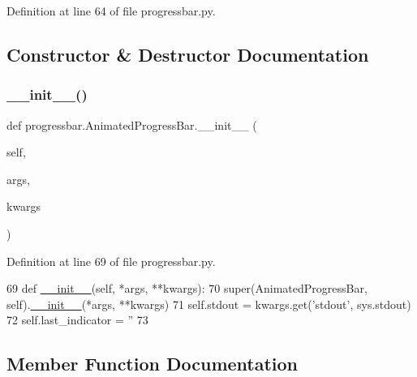 Definition at line 64 of file progressbar.\+py.



\subsection{Constructor \& Destructor Documentation}
\mbox{\label{classprogressbar_1_1AnimatedProgressBar_ac5fb173f8610ea6caa27306a60a8903f}} 
\subsubsection{\texorpdfstring{\+\_\+\+\_\+init\+\_\+\+\_\+()}{\_\_init\_\_()}}
{\footnotesize\ttfamily def progressbar.\+Animated\+Progress\+Bar.\+\_\+\+\_\+init\+\_\+\+\_\+ (\begin{DoxyParamCaption}\item[{}]{self,  }\item[{}]{args,  }\item[{}]{kwargs }\end{DoxyParamCaption})}



Definition at line 69 of file progressbar.\+py.


\begin{DoxyCode}
69     \textcolor{keyword}{def }\hyperlink{classwrapper_1_1ModuleDictWrapper_a9a7a794150502f51df687831583e13b9}{\_\_init\_\_}(self, *args, **kwargs):
70         super(AnimatedProgressBar, self).\hyperlink{classwrapper_1_1ModuleDictWrapper_a9a7a794150502f51df687831583e13b9}{\_\_init\_\_}(*args, **kwargs)
71         self.stdout = kwargs.get(\textcolor{stringliteral}{'stdout'}, sys.stdout)
72         self.last\_indicator = \textcolor{stringliteral}{''}
73 
\end{DoxyCode}


\subsection{Member Function Documentation}
\mbox{\label{classprogressbar_1_1AnimatedProgressBar_a87d45550598b83128ee14b4d7acdea27}} 
